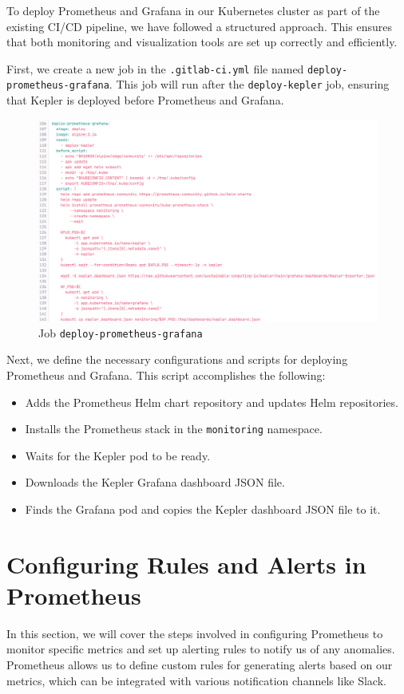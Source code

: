 To deploy Prometheus and Grafana in our Kubernetes cluster as part of the existing CI/CD pipeline, we have followed a structured approach. This ensures that both monitoring and visualization tools are set up correctly and efficiently.

First, we create a new job in the \texttt{.gitlab-ci.yml} file named \texttt{deploy-prometheus-grafana}. This job will run after the \texttt{deploy-kepler} job, ensuring that Kepler is deployed before Prometheus and Grafana.

\begin{figure}[H]
  \centering
  \includegraphics[width=16cm]{Figures/deploy-prometheus-grafana-job.png}
  \caption{Job \texttt{deploy-prometheus-grafana}}
\end{figure}

Next, we define the necessary configurations and scripts for deploying Prometheus and Grafana.
This script accomplishes the following:

\begin{itemize}
  \item Adds the Prometheus Helm chart repository and updates Helm repositories.
  \item Installs the Prometheus stack in the \texttt{monitoring} namespace.
  \item Waits for the Kepler pod to be ready.
  \item Downloads the Kepler Grafana dashboard JSON file.
  \item Finds the Grafana pod and copies the Kepler dashboard JSON file to it.
\end{itemize}

\section{Configuring Rules and Alerts in Prometheus}
In this section, we will cover the steps involved in configuring Prometheus to monitor specific metrics and set up alerting rules to notify us of any anomalies. Prometheus allows us to define custom rules for generating alerts based on our metrics, which can be integrated with various notification channels like Slack.

